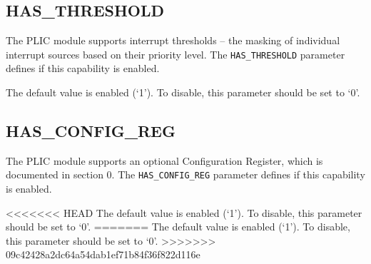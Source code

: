 \subsection{HAS\_THRESHOLD}

The PLIC module supports interrupt thresholds -- the masking of individual interrupt sources based on their priority level.
The \texttt{HAS\_THRESHOLD} parameter defines if this capability is enabled.

The default value is enabled (`1'). To disable, this parameter should be set to `0'.

\subsection{HAS\_CONFIG\_REG}

The PLIC module supports an optional Configuration Register, which is documented in section 0.
The \texttt{HAS\_CONFIG\_REG} parameter defines if this capability is enabled.

<<<<<<< HEAD
The default value is enabled (`1'). To disable, this parameter should be set to `0'.
=======
The default value is enabled (`1'). To disable, this parameter should be set to `0'.
>>>>>>> 09c42428a2dc64a54dab1ef71b84f36f822d116e
